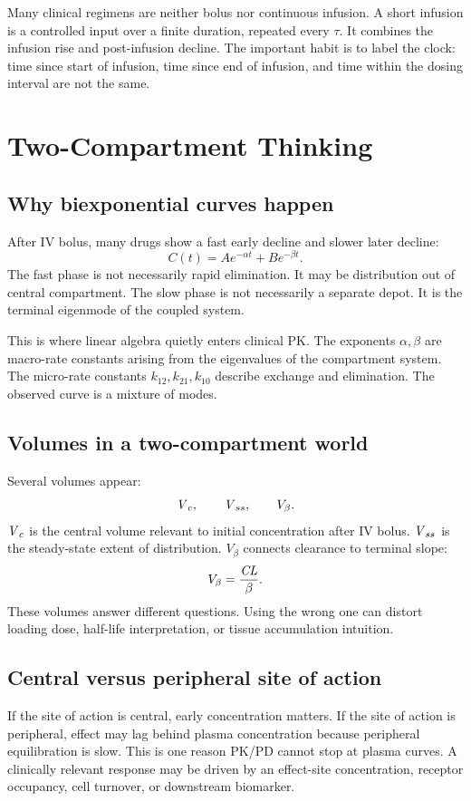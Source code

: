 \documentclass[a4paper]{article}
\newcommand{\pkCL}{\pksym{CL}}
\newcommand{\pkVc}{\pksym{V}_{c}}
\newcommand{\pkVss}{\pksym{V}_{ss}}
\begin{document}
Many clinical regimens are neither bolus nor continuous infusion. A short infusion is a controlled input over a finite duration, repeated every \(\tau\). It combines the infusion rise and post-infusion decline. The important habit is to label the clock: time since start of infusion, time since end of infusion, and time within the dosing interval are not the same.

\section{Two-Compartment Thinking}

\subsection{Why biexponential curves happen}

After IV bolus, many drugs show a fast early decline and slower later decline:
\[
  C(t)=Ae^{-\alpha t}+Be^{-\beta t}.
\]
The fast phase is not necessarily rapid elimination. It may be distribution out of central compartment. The slow phase is not necessarily a separate depot. It is the terminal eigenmode of the coupled system.

This is where linear algebra quietly enters clinical PK. The exponents \(\alpha,\beta\) are macro-rate constants arising from the eigenvalues of the compartment system. The micro-rate constants \(k_{12},k_{21},k_{10}\) describe exchange and elimination. The observed curve is a mixture of modes.

\subsection{Volumes in a two-compartment world}

Several volumes appear:
\[
  \pkVc,\qquad
  \pkVss,\qquad
  V_\beta.
\]
\(\pkVc\) is the central volume relevant to initial concentration after IV bolus. \(\pkVss\) is the steady-state extent of distribution. \(V_\beta\) connects clearance to terminal slope:
\[
  V_\beta=\frac{\pkCL}{\beta}.
\]
These volumes answer different questions. Using the wrong one can distort loading dose, half-life interpretation, or tissue accumulation intuition.

\subsection{Central versus peripheral site of action}

If the site of action is central, early concentration matters. If the site of action is peripheral, effect may lag behind plasma concentration because peripheral equilibration is slow. This is one reason PK/PD cannot stop at plasma curves. A clinically relevant response may be driven by an effect-site concentration, receptor occupancy, cell turnover, or downstream biomarker.
\end{document}
